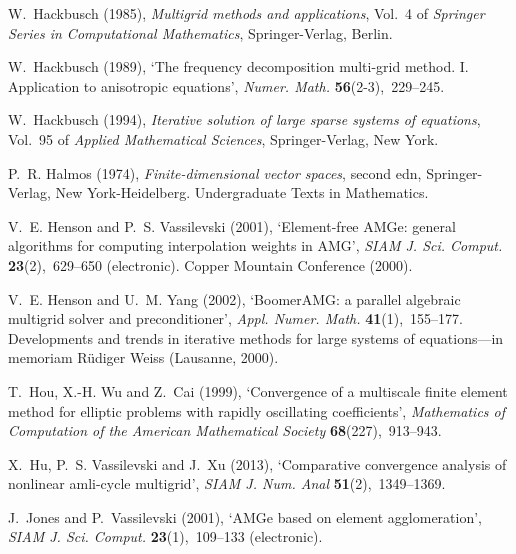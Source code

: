 \documentclass[12pt]{acta_2011xz}
\begin{document}
\begin{thebibliography}{xx}
W.~Hackbusch  (1985), {\em Multigrid methods and applications}, Vol.~4 of {\em
  Springer Series in Computational Mathematics}, Springer-Verlag, Berlin.

W.~Hackbusch  (1989), `The frequency decomposition multi-grid method. {I}.
  {A}pplication to anisotropic equations', {\em Numer. Math.} {\bf
  56}(2-3),~229--245.

W.~Hackbusch  (1994), {\em Iterative solution of large sparse systems of
  equations}, Vol.~95 of {\em Applied Mathematical Sciences}, Springer-Verlag,
  New York.

P.~R. Halmos  (1974), {\em Finite-dimensional vector spaces}, second edn,
  Springer-Verlag, New York-Heidelberg.
\newblock Undergraduate Texts in Mathematics.

V.~E. Henson and P.~S. Vassilevski  (2001), `Element-free {AMG}e: general
  algorithms for computing interpolation weights in {AMG}', {\em SIAM J. Sci.
  Comput.} {\bf 23}(2),~629--650 (electronic).
\newblock Copper Mountain Conference (2000).

V.~E. Henson and U.~M. Yang  (2002), `Boomer{AMG}: a parallel algebraic
  multigrid solver and preconditioner', {\em Appl. Numer. Math.} {\bf
  41}(1),~155--177.
\newblock Developments and trends in iterative methods for large systems of
  equations---in memoriam R\"{u}diger Weiss (Lausanne, 2000).

T.~Hou, X.-H. Wu and Z.~Cai  (1999), `Convergence of a multiscale finite
  element method for elliptic problems with rapidly oscillating coefficients',
  {\em Mathematics of Computation of the American Mathematical Society} {\bf
  68}(227),~913--943.

X.~Hu, P.~S. Vassilevski and J.~Xu  (2013), `Comparative convergence analysis
  of nonlinear amli-cycle multigrid', {\em SIAM J. Num. Anal} {\bf
  51}(2),~1349--1369.

J.~Jones and P.~Vassilevski  (2001), `A{MG}e based on element agglomeration',
  {\em SIAM J. Sci. Comput.} {\bf 23}(1),~109--133 (electronic).


\end{thebibliography}
\end{document}

